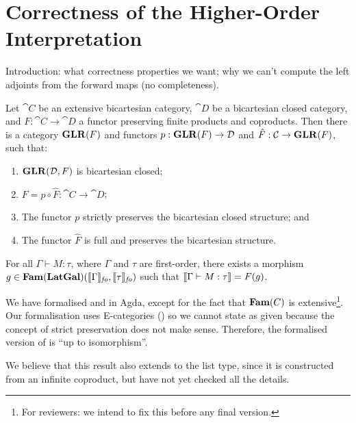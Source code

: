 \section{Correctness of the Higher-Order Interpretation}
\label{sec:definability}

Introduction: what correctness properties we want; why we can't
compute the left adjoints from the forward maps (no completeness).

\begin{theorem}
  \label{thm:glr-definability}
  Let $\cat{C}$ be an extensive bicartesian category, $\cat{D}$ be a
  bicartesian closed category, and $F : \cat{C} \to \cat{D}$ a functor
  preserving finite products and coproducts. Then there is a category
  $\mathbf{GLR}(F)$ and functors $p : \mathbf{GLR}(F) \to \mathcal{D}$ and
  $\hat{F} : \mathcal{C} \to \mathbf{GLR}(F)$, such that:
  \begin{enumerate}
  \item $\mathbf{GLR}(\mathcal{D},F)$ is bicartesian closed;
  \item $F = p \circ \hat{F} : \cat{C} \to \cat{D}$;
  \item The functor $p$ strictly preserves the bicartesian closed structure; and
  \item The functor $\hat{F}$ is full and preserves the bicartesian structure.
  \end{enumerate}
\end{theorem}

\begin{theorem}
  \label{thm:language-definability}
  For all $\Gamma \vdash M : \tau$, where $\Gamma$ and $\tau$ are
  first-order, there exists a morphism
  $g \in \mathbf{Fam}(\mathbf{LatGal})(\llbracket \Gamma \rrbracket_{\mathit{fo}},
  \llbracket \tau \rrbracket_{\mathit{fo}})$ such that
  $\llbracket \Gamma \vdash M : \tau \rrbracket = F(g)$.
\end{theorem}

\begin{remark}
  We have formalised  and
   in Agda, except for the fact that
  $\mathbf{Fam}(C)$ is extensive\footnote{For reviewers: we intend to fix this
    before any final version.}. Our formalisation uses E-categories
  (\cite{palmgren-wilander}) so we cannot state
   as given because the concept of strict
  preservation does not make sense. Therefore, the formalised version
  of  is ``up to isomorphism''.

  We believe that this result also extends to the list type, since it
  is constructed from an infinite coproduct, but have not yet checked
  all the details.
\end{remark}

